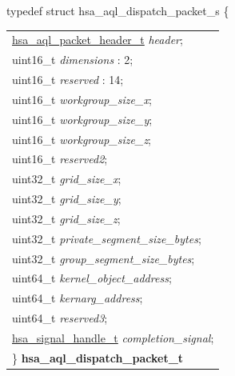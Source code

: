 \documentclass[final]{book}
\newcommand{\reffld}[1]{\textit{#1}}
\begin{document}
\begin{appendices}
\noindent\begin{tcolorbox}[breakable,nobeforeafter,arc=0mm,colframe=white,colback=lightgray,left=0mm]
typedef struct  hsa_aql_dispatch_packet_s \{
\vspace{-3.5mm}\begin{longtable}{@{}p{\textwidth}}
\hspace{1.7em}\hyperlink{group--aql-1ga92558e047d003985bae2558febd3dd40}{hsa_aql_packet_header_t} \reffld{header};\\
\hspace{1.7em}uint16_t \reffld{dimensions} : 2;\\
\hspace{1.7em}uint16_t \reffld{reserved} : 14;\\
\hspace{1.7em}uint16_t \reffld{workgroup_size_x};\\
\hspace{1.7em}uint16_t \reffld{workgroup_size_y};\\
\hspace{1.7em}uint16_t \reffld{workgroup_size_z};\\
\hspace{1.7em}uint16_t \reffld{reserved2};\\
\hspace{1.7em}uint32_t \reffld{grid_size_x};\\
\hspace{1.7em}uint32_t \reffld{grid_size_y};\\
\hspace{1.7em}uint32_t \reffld{grid_size_z};\\
\hspace{1.7em}uint32_t \reffld{private_segment_size_bytes};\\
\hspace{1.7em}uint32_t \reffld{group_segment_size_bytes};\\
\hspace{1.7em}uint64_t \reffld{kernel_object_address};\\
\hspace{1.7em}uint64_t \reffld{kernarg_address};\\
\hspace{1.7em}uint64_t \reffld{reserved3};\\
\hspace{1.7em}\hyperlink{group--signals-1ga6592c136d70853d855bc11d9efdbf534}{hsa_signal_handle_t} \reffld{completion_signal};\\
\}  \hypertarget{group--aql-1gab3d5ded5ac53f70931768468c0c0cfd6}{\textbf{hsa_aql_dispatch_packet_t}}
\end{longtable}


\end{tcolorbox}
\end{appendices}
\end{document}
